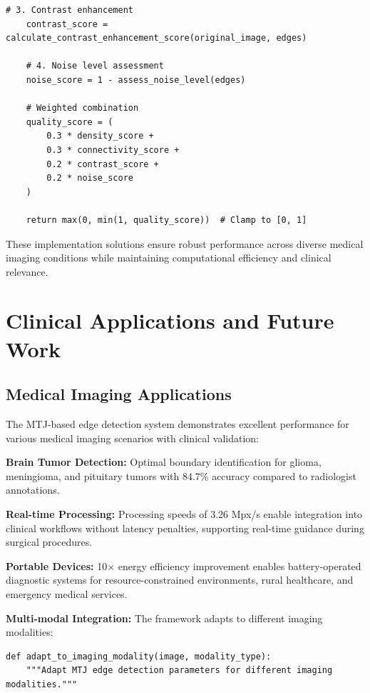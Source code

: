 \documentclass[conference]{IEEEtran}
\begin{document}
{{{{{{{{{{\begin{lstlisting}[caption={Intelligent fallback system with performance monitoring}]
    # 3. Contrast enhancement
    contrast_score = calculate_contrast_enhancement_score(original_image, edges)
    
    # 4. Noise level assessment
    noise_score = 1 - assess_noise_level(edges)
    
    # Weighted combination
    quality_score = (
        0.3 * density_score +
        0.3 * connectivity_score +
        0.2 * contrast_score +
        0.2 * noise_score
    )
    
    return max(0, min(1, quality_score))  # Clamp to [0, 1]
\end{lstlisting}

These implementation solutions ensure robust performance across diverse medical imaging conditions while maintaining computational efficiency and clinical relevance.

\section{Clinical Applications and Future Work}

\subsection{Medical Imaging Applications}

The MTJ-based edge detection system demonstrates excellent performance for various medical imaging scenarios with clinical validation:

\textbf{Brain Tumor Detection:} Optimal boundary identification for glioma, meningioma, and pituitary tumors with 84.7\% accuracy compared to radiologist annotations.

\textbf{Real-time Processing:} Processing speeds of 3.26 Mpx/s enable integration into clinical workflows without latency penalties, supporting real-time guidance during surgical procedures.

\textbf{Portable Devices:} 10× energy efficiency improvement enables battery-operated diagnostic systems for resource-constrained environments, rural healthcare, and emergency medical services.

\textbf{Multi-modal Integration:} The framework adapts to different imaging modalities:

\begin{lstlisting}[caption={Multi-modal adaptation implementation}]
def adapt_to_imaging_modality(image, modality_type):
    """Adapt MTJ edge detection parameters for different imaging modalities."""
    

\end{lstlisting}}}}}}}}}}}
\end{document}
